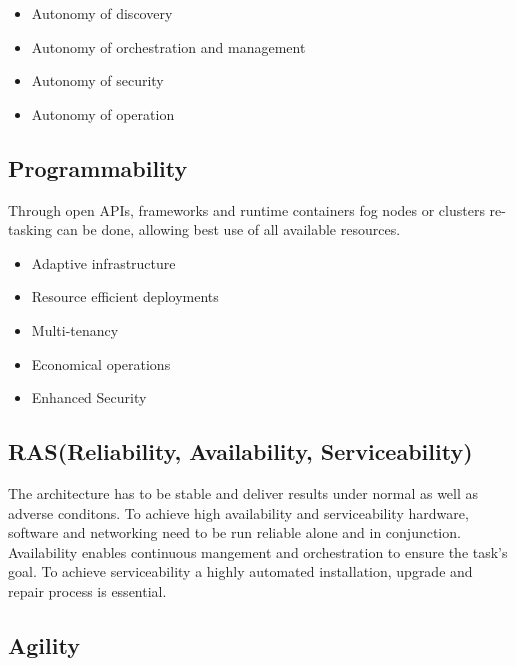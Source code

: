 \begin{itemize}
	\item Autonomy of discovery
	\item Autonomy of orchestration and management
	\item Autonomy of security
	\item Autonomy of operation
\end{itemize}

\subsection{Programmability}

Through open APIs, frameworks and runtime containers fog nodes or clusters re-tasking can be done, allowing best use of all available resources.

\begin{itemize}
	\item Adaptive infrastructure
	\item Resource efficient deployments
	\item Multi-tenancy
	\item Economical operations
	\item Enhanced Security
\end{itemize}

\subsection{RAS(Reliability, Availability, Serviceability)}

The architecture has to be stable and deliver results under normal as well as adverse conditons.
To achieve high availability and serviceability  hardware, software and networking need to be run reliable alone and in conjunction.
Availability enables continuous mangement and orchestration to ensure the task's goal.
To achieve serviceability a highly automated installation, upgrade and repair process is essential.

\subsection{Agility}


